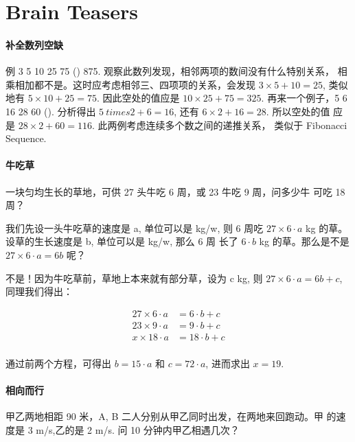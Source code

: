 \chapter{Brain Teasers}
\label{cha:brain-teasers}

\subsubsection{补全数列空缺}

例 3 5 10 25 75 () 875. 观察此数列发现，相邻两项的数间没有什么特别关系，
相乘相加都不是。这时应考虑相邻三、四项项的关系，会发现 $3 \times 5 + 10
= 25$, 类似地有 $5 \times 10 + 25 = 75$. 因此空处的值应是 $10
\times 25 + 75 = 325$. 再来一个例子，5 6 16 28 60 (). 分析得出
$5 \ times 2 + 6 = 16$, 还有 $6 \times 2 + 16 = 28$. 所以空处的值
应是 $28 \times 2 + 60 = 116$. 此两例考虑连续多个数之间的递推关系，
类似于 Fibonacci Sequence.

\subsubsection{牛吃草}

一块匀均生长的草地，可供 27 头牛吃 6 周，或 23 牛吃 9 周，问多少牛
可吃 18 周？

我们先设一头牛吃草的速度是 a, 单位可以是 kg/w, 则 6 周吃 $27 \times 6
\cdot a$ kg 的草。设草的生长速度是 b, 单位可以是 kg/w, 那么 6 周
长了 $6 \cdot b$ kg 的草。那么是不是 $27 \times 6 \cdot a = 6b$ 呢？

不是！因为牛吃草前，草地上本来就有部分草，设为 c kg, 则 $27 \times
6 \cdot a = 6b + c$, 同理我们得出：

\[
  \begin{aligned}
    27 \times 6 \cdot a &= 6 \cdot b + c \\
    23 \times 9 \cdot a &= 9 \cdot b + c \\
    x \times 18 \cdot a &= 18 \cdot b + c \\
  \end{aligned}
\]

通过前两个方程，可得出 $b = 15 \cdot a$ 和 $c = 72 \cdot a$, 进而求出 $x = 19$.

\subsubsection{相向而行}

甲乙两地相距 90 米，A, B 二人分别从甲乙同时出发，在两地来回跑动。甲
的速度是 3 m/s,乙的是 2 m/s. 问 10 分钟内甲乙相遇几次？

